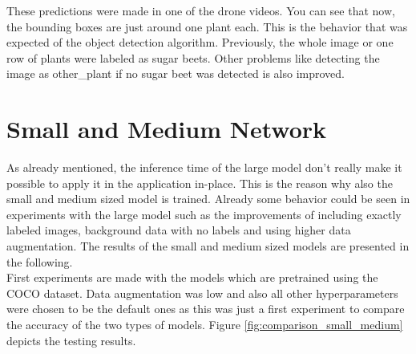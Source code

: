 These predictions were made in one of the drone videos. You can see that now, the bounding boxes are just around one plant each. This is the behavior that was expected of the object detection algorithm. Previously, the whole image or one row of plants were labeled as sugar beets. Other problems like detecting the image as other\_plant if no sugar beet was detected is also improved. 

\section{Small and Medium Network}

As already mentioned, the inference time of the large model don't really make it possible to apply it in the application in-place. This is the reason why also the small and medium sized model is trained. Already some behavior could be seen in experiments with the large model such as the improvements of including exactly labeled images, background data with no labels and using higher data augmentation. The results of the small and medium sized models are presented in the following. \\

First experiments are made with the models which are pretrained using the COCO dataset. Data augmentation was low and also all other hyperparameters were chosen to be the default ones as this was just a first experiment to compare the accuracy of the two types of models. Figure \ref{fig:comparison_small_medium} depicts the testing results. 

